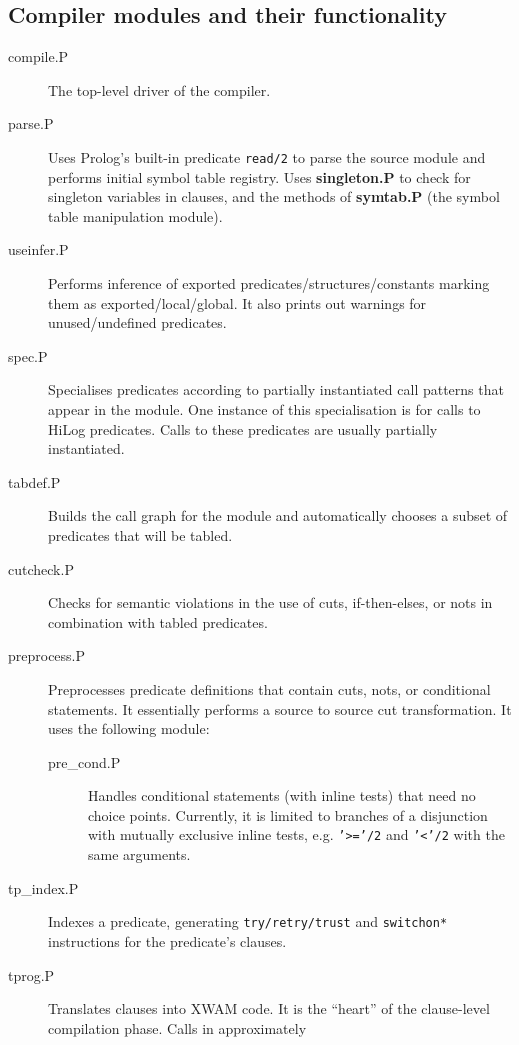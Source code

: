 \subsection{Compiler modules and their functionality}
\begin{description}
\item[compile.P] The top-level driver of the compiler.
\item[parse.P]	Uses Prolog's built-in predicate {\tt read/2} to parse
		the source module and performs initial symbol table registry.
		Uses {\bf singleton.P} to check for singleton variables in
		clauses, and the methods of {\bf symtab.P} (the symbol table
		manipulation module).
\item[useinfer.P]
		Performs inference of exported predicates/structures/constants
		marking them as exported/local/global.  It also prints out
		warnings for unused/undefined predicates.
\item[spec.P]	Specialises predicates according to partially instantiated
		call patterns that appear in the module.  One instance of this
		specialisation is for calls to HiLog predicates.  Calls to
		these predicates are usually partially instantiated.
\item[tabdef.P] Builds the call graph for the module and automatically chooses
		a subset of predicates that will be tabled.
\item[cutcheck.P]
		Checks for semantic violations in the use of cuts,
		if-then-elses, or nots in combination with tabled predicates.
\item[preprocess.P]
		Preprocesses predicate definitions that contain cuts, nots,
		or conditional statements.  It essentially performs
		a source to source cut transformation.  It uses the
		following module:
	\begin{description}
	\item[pre\_cond.P] Handles conditional statements (with inline tests)
		that need no choice points.  Currently, it is limited to
		branches of a disjunction with mutually exclusive inline
		tests, e.g. {\tt '>='/2} and {\tt '<'/2} with the same
		arguments.
	\end{description}
\item[tp\_index.P] Indexes a predicate, generating {\tt try/retry/trust}
		and {\tt switchon*} instructions for the predicate's clauses.
\item[tprog.P]	Translates clauses into XWAM code.  It is the ``heart''
		of the clause-level compilation phase. Calls in approximately

\end{description}

